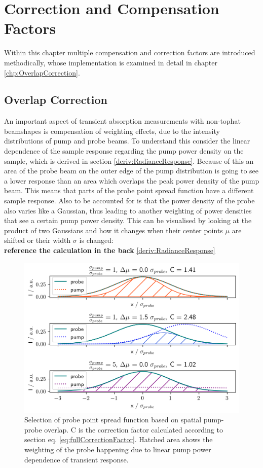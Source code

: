 \documentclass[twoside,openright]{scrreprt}
\begin{document}
\chapter{Correction and Compensation Factors}\label{chap:CorrandComp}
Within this chapter multiple compensation and correction factors are introduced methodically, whose implementation is examined in detail in chapter \ref{chp:OverlapCorrection}.
\section{Overlap Correction}\label{sec:overlapCorrDescription}
An important aspect of transient absorption measurements with non-tophat beamshapes is compensation of weighting effects, due to the intensity distributions of pump and probe beams. To understand this consider the linear dependence of the sample response regarding the pump power density on the sample, which is derived in section \ref{deriv:RadianceResponse}. Because of this an area of the probe beam on the outer edge of the pump distribution is going to see a lower response than an area which overlaps the peak power density of the pump beam. This means that parts of the probe point spread function have a different sample response. Also to be accounted for is that the power density of the probe also varies like a Gaussian, thus leading to another weighting of power densities that see a certain pump power density.
This can be visualised by looking at the product of two Gaussians and how it changes when their center points $\mu$ are shifted or their width $\sigma$ is changed:\\ 
\textbf{reference the calculation in the back} \ref{deriv:RadianceResponse}

\begin{figure}[!hb]
\centering
\includegraphics[scale=1]{images/OverlapVisualisationProbeSelection.png}
\caption{Selection of probe point spread function based on spatial pump-probe overlap. C is the correction factor calculated according to section eq. \ref{eq:fullCorrectionFactor}. Hatched area shows the weighting of the probe happening due to linear pump power dependence of transient response.\label{fig:overlapVisualisation}}
\end{figure}
\end{document}
